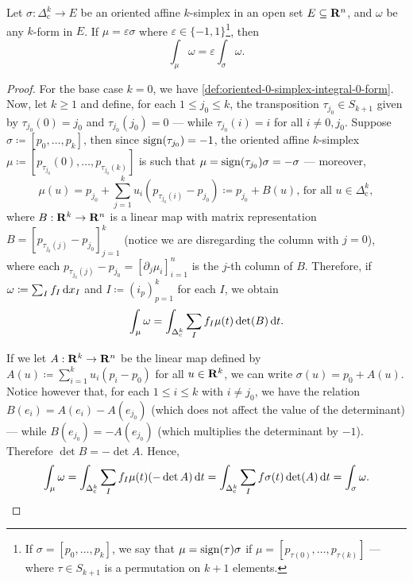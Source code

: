 \begin{proposition}\label{prop:integral-simplex-change-orientation}
    Let \(\sigma: \Delta_{\text{c}}^k \to E\) be an oriented affine \(k\)-simplex in
    an open set \(E \subseteq \mathbf{R}^n\), and \(\omega\) be any \(k\)-form in \(E\). If
    \(\mu = \varepsilon \sigma\) where \(\varepsilon \in \{-1, 1\}\)\footnote{If
    \(\sigma = [p_0, \dots, p_k]\), we say that \(\mu = \operatorname{sign}(\tau) \sigma\) if
    \(\mu = [p_{\tau(0)}, \dots, p_{\tau(k)}]\) --- where \(\tau \in S_{k+1}\) is a
    permutation on \(k+1\) elements.}, then
    \[
        \int_{\mu} \omega = \varepsilon \int_{\sigma} \omega.
    \]
\end{proposition}

\begin{proof}
    For the base case \(k=0\), we have
    \cref{def:oriented-0-simplex-integral-0-form}. Now, let \(k \geq 1\) and define,
    for each \(1 \leq j_0 \leq k\), the transposition \(\tau_{j_0} \in S_{k+1}\)
    given by \(\tau_{j_0}(0) = j_0\) and \(\tau_{j_0}(j_0) = 0\) --- while
    \(\tau_{j_0}(i) = i\) for all \(i \neq 0, j_0\). Suppose \(\sigma \coloneq [p_0,
        \dots, p_{k}]\), then since \(\operatorname{sign}(\tau_{j_0}) = -1\), the oriented affine
    \(k\)-simplex \(\mu \coloneq [p_{\tau_{j_{0}}}(0), \dots, p_{\tau_{j_0}(k)}]\) is
    such that \(\mu = \operatorname{sign}(\tau_{j_0}) \sigma = -\sigma\) --- moreover,
    \[
        \mu(u) = p_{j_0} + \sum_{j=1}^k u_i (p_{\tau_{j_0}(i)} - p_{j_0})
        \coloneq p_{j_0} + B(u)
        \text{, for all } u \in \Delta_{\text{c}}^k,
    \]
    where \(B: \mathbf{R}^k \to \mathbf{R}^n\) is a linear map with matrix representation \(B =
    [p_{\tau_{j_0}(j)} - p_{j_0}]_{j=1}^k\) (notice we are disregarding the column
    with \(j = 0\)), where each \(p_{\tau_{j_0}(j)} - p_{j_0} = [\partial_j
            \mu_i]_{i=1}^n\) is the \(j\)-th column of \(B\). Therefore, if \(\omega
    \coloneq \sum_I f_I\, \mathrm{d} x_{I}\) and \(I \coloneq (i_p)_{p=1}^k\) for each
    \(I\), we obtain
    \[
        \int_{\mu} \omega
        = \int_{\Delta_{\text{c}}^k}
        \sum_I f_I \mu(t) \det(B)\, \mathrm{d} t.
    \]

    If we let \(A: \mathbf{R}^k \to \mathbf{R}^n\) be the linear map defined by \(A(u) \coloneq
    \sum_{i=1}^k u_i (p_i - p_0)\) for all \(u \in \mathbf{R}^k\), we can write \(\sigma(u)
    = p_0 + A(u)\). Notice however that, for each \(1 \leq i \leq k\) with \(i \neq
    j_0\), we have the relation \(B(e_i) = A(e_i) - A(e_{j_0})\) (which does not
    affect the value of the determinant) --- while \(B(e_{j_0}) = - A(e_{j_0})\)
    (which multiplies the determinant by \(-1\)). Therefore \(\det B = - \det
    A\). Hence,
    \begin{equation}
        \label{eq:dets-change-sign-int-form}
        \int_{\mu} \omega
        = \int_{\Delta_{\text{c}}^k} \sum_I f_I \mu(t) (- \det A)\, \mathrm{d} t
        = \int_{\Delta_{\text{c}}^k} \sum_{I} f \sigma(t) \det(A)\, \mathrm{d} t
        = \int_{\sigma} \omega.
    \end{equation}


\end{proof}
